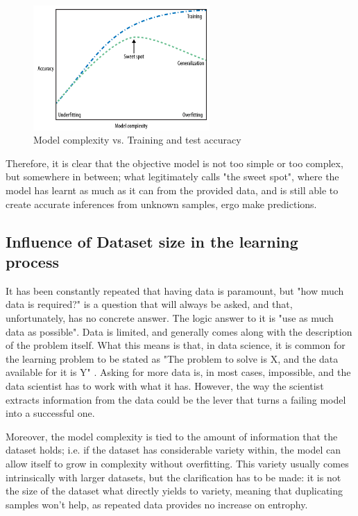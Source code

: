 \begin{figure}[!htb]
    \centering
      \includegraphics[width=0.6\textwidth]{figures/model_complexity}
      \caption{Model complexity vs. Training and test accuracy \cite{Andreas}}
      \label{fig:model_complexity}
\end{figure}

Therefore, it is clear that the objective model is not too simple or too complex, but somewhere in between; what \cite{Andreas} legitimately calls "the sweet spot", where the model has learnt as much as it can from the provided data, and is still able to create accurate inferences from unknown samples, ergo make predictions.


\subsection{Influence of Dataset size in the learning process}\label{ch:size}
It has been constantly repeated that having data is paramount, but "how much data is required?" is a question that will always be asked, and that, unfortunately, has no concrete answer. The logic answer to it is "use as much data as possible". Data is limited, and generally comes along with the description of the problem itself. What this means is that, in data science, it is common for the learning problem to be stated as "The problem to solve is X, and the data available for it is Y" \cite{Yaser}. Asking for more data is, in most cases, impossible, and the data scientist has to work with what it has. However, the way the scientist extracts information from the data could be the lever that turns a failing model into a successful one.

Moreover, the model complexity is tied to the amount of information that the dataset holds; i.e. if the dataset has considerable variety within, the model can allow itself to grow in complexity without overfitting. This variety usually comes intrinsically with larger datasets, but the clarification has to be made: it is not the size of the dataset what directly yields to variety, meaning that duplicating samples won't help, as repeated data provides no increase on entrophy.

